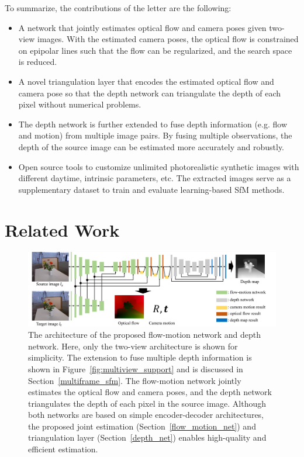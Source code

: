 \documentclass[letterpaper, 10 pt, conference]{ieeeconf}  %
\begin{document}
To summarize, the contributions of the letter are the following:
\begin{itemize}
   
\item A network that jointly estimates optical flow and camera poses given two-view images. With the estimated camera poses, the optical flow is constrained on epipolar lines such that the flow can be regularized, and the search space is reduced.
   
\item A novel triangulation layer that encodes the estimated optical flow and camera pose so that the depth network can triangulate the depth of each pixel without numerical problems.
   
\item The depth network is further extended to fuse depth information (e.g. flow and motion) from multiple image pairs. By fusing multiple observations, the depth of the source image can be estimated more accurately and robustly.
   
\item Open source tools to customize unlimited photorealistic synthetic images with different daytime, intrinsic parameters, etc. The extracted images serve as a supplementary dataset to train and evaluate learning-based SfM methods.
\end{itemize}


\section{Related Work}
 
\begin{figure}[h]
\vspace{0.3cm}
    \begin{center}
        \includegraphics[width=0.9\linewidth]{figs/architecture.pdf}
    \end{center}
\vspace{-0.3cm}
\caption{The architecture of the proposed flow-motion network and depth network. Here, only the two-view architecture is shown for simplicity. The extension to fuse multiple depth information is shown in Figure~\ref{fig:multiview_support} and is discussed in Section~\ref{multiframe_sfm}. The flow-motion network jointly estimates the optical flow and camera poses, and the depth network triangulates the depth of each pixel in the source image. Although both networks are based on simple encoder-decoder architectures, the proposed joint estimation (Section~\ref{flow_motion_net}) and triangulation layer (Section~\ref{depth_net}) enables high-quality and efficient estimation.}
   
\label{fig:architecture}
   
\vspace{-0.5cm}
\end{figure}
 
\end{document}
